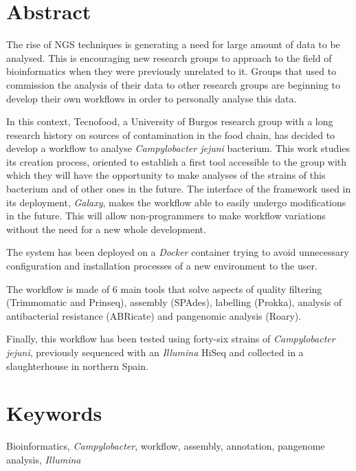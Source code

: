 \newpage

\section*{Abstract}
The rise of NGS techniques is generating a need for large amount of data to be analysed. This is encouraging new research groups to approach to the field of bioinformatics when they were previously unrelated to it. Groups that used to commission the analysis of their data to other research groups are beginning to develop their own workflows in order to personally analyse this data.

In this context, Tecnofood, a University of Burgos research group with a long research history on sources of contamination in the food chain, has decided to develop a workflow to analyse \textit{Campylobacter jejuni} bacterium. This work studies its creation process, oriented to establish a first tool accessible to the group with which they will have the opportunity to make analyses of the strains of this bacterium and of other ones in the future. The interface of the framework used in its deployment, \textit{Galaxy}, makes the workflow able to easily undergo modifications in the future. This will allow non-programmers to make workflow variations without the need for a new whole development.

The system has been deployed on a \textit{Docker} container trying to avoid unnecessary configuration and installation processes of a new environment to the user.

The workflow is made of 6 main tools that solve aspects of quality filtering (Trimmomatic and Prinseq), assembly (SPAdes), labelling (Prokka), analysis of antibacterial resistance (ABRicate) and pangenomic analysis (Roary).

Finally, this workflow has been tested using forty-six strains of \textit{Campylobacter jejuni}, previously sequenced with an \textit{Illumina} HiSeq and collected in a slaughterhouse in northern Spain.

\section*{Keywords}
Bioinformatics, \textit{Campylobacter}, workflow, assembly, annotation, pangenome analysis, \textit{Illumina}
